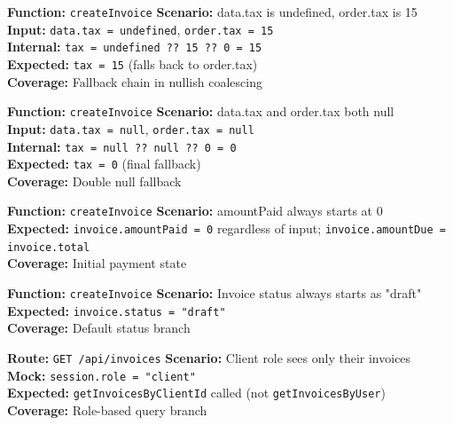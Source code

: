 \documentclass[12pt,a4paper]{report}
\newcommand{\pone}{\textbf{\color{p1red}P1}}
\newcommand{\ptwo}{\textbf{\color{p2orange}P2}}
\newcommand{\pthree}{\textbf{\color{p3blue}P3}}
\begin{document}
\begin{tcolorbox}[testbox,title={INV-009 \hfill \pthree}]
\textbf{Function:} \texttt{createInvoice} \quad \textbf{Scenario:} data.tax is undefined, order.tax is 15 \\
\textbf{Input:} \texttt{data.tax = undefined}, \texttt{order.tax = 15} \\
\textbf{Internal:} \texttt{tax = undefined ?? 15 ?? 0 = 15} \\
\textbf{Expected:} \texttt{tax = 15} (falls back to order.tax) \\
\textbf{Coverage:} Fallback chain in nullish coalescing
\end{tcolorbox}

\begin{tcolorbox}[testbox,title={INV-010 \hfill \pthree}]
\textbf{Function:} \texttt{createInvoice} \quad \textbf{Scenario:} data.tax and order.tax both null \\
\textbf{Input:} \texttt{data.tax = null}, \texttt{order.tax = null} \\
\textbf{Internal:} \texttt{tax = null ?? null ?? 0 = 0} \\
\textbf{Expected:} \texttt{tax = 0} (final fallback) \\
\textbf{Coverage:} Double null fallback
\end{tcolorbox}

\begin{tcolorbox}[testbox,title={INV-011 \hfill \pone}]
\textbf{Function:} \texttt{createInvoice} \quad \textbf{Scenario:} amountPaid always starts at 0 \\
\textbf{Expected:} \texttt{invoice.amountPaid = 0} regardless of input; \texttt{invoice.amountDue = invoice.total} \\
\textbf{Coverage:} Initial payment state
\end{tcolorbox}

\begin{tcolorbox}[testbox,title={INV-012 \hfill \pone}]
\textbf{Function:} \texttt{createInvoice} \quad \textbf{Scenario:} Invoice status always starts as "draft" \\
\textbf{Expected:} \texttt{invoice.status = "draft"} \\
\textbf{Coverage:} Default status branch
\end{tcolorbox}

\begin{tcolorbox}[testbox,title={INV-013 \hfill \ptwo}]
\textbf{Route:} \texttt{GET /api/invoices} \quad \textbf{Scenario:} Client role sees only their invoices \\
\textbf{Mock:} \texttt{session.role = "client"} \\
\textbf{Expected:} \texttt{getInvoicesByClientId} called (not \texttt{getInvoicesByUser}) \\
\textbf{Coverage:} Role-based query branch
\end{tcolorbox}
\end{document}
